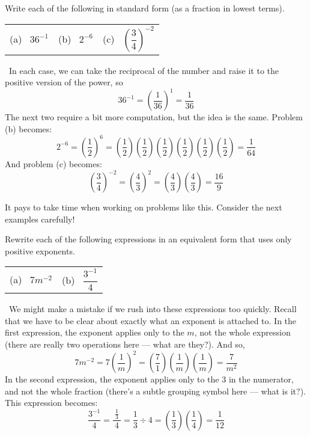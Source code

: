 \begin{boxex}
Write each of the following in standard form (as a fraction in lowest terms).

\begin{center}
\begin{tabularx}{0.6\textwidth}{XXX}
(a)~ $36^{-1}$
&
(b)~ $2^{-6}$
&
(c)~ $\left(\dfrac{3}{4}\right)^{-2}$
\end{tabularx}
\end{center}

\exsoln\ In each case, we can take the reciprocal of the number and raise it to the positive version of the power, so \[36^{-1} = \left(\frac{1}{36}\right)^1 = \frac{1}{36}\]
The next two require a bit more computation, but the idea is the same. Problem (b) becomes:
\[2^{-6} = \left(\frac{1}{2}\right)^6 = \left(\frac{1}{2}\right)\left(\frac{1}{2}\right)\left(\frac{1}{2}\right)\left(\frac{1}{2}\right)\left(\frac{1}{2}\right)\left(\frac{1}{2}\right) = \frac{1}{64}\]
And problem (c) becomes:
\[\left(\frac{3}{4}\right)^{-2} = \left(\frac{4}{3}\right)^2 = \left(\frac{4}{3}\right)\left(\frac{4}{3}\right) = \frac{16}{9}\]
\end{boxex}

It pays to take time when working on problems like this. Consider the next examples carefully!

\begin{boxex}
Rewrite each of the following expressions in an equivalent form that uses only positive exponents.
\begin{center}
\begin{tabularx}{0.4\textwidth}{XX}
(a)~ $7m^{-2}$
&
(b)~ $\dfrac{3^{-1}}{~4~}$
\end{tabularx}
\end{center}

\exsoln\ We might make a mistake if we rush into these expressions too quickly. Recall that we have to be clear about exactly what an exponent is attached to. In the first expression, the exponent applies only to the $m$, not the whole expression (there are really two operations here --- what are they?). And so,
\[7m^{-2} = 7\left(\frac{1}{m}\right)^2 = \left(\frac{7}{1}\right)\left(\frac{1}{m}\right)\left(\frac{1}{m}\right) = \frac{7}{m^2}\]
In the second expression, the exponent applies only to the 3 in the numerator, and not the whole fraction (there's a subtle grouping symbol here --- what is it?). This expression becomes:
\[\dfrac{3^{-1}}{~4~} = \dfrac{\tfrac{1}{3}}{~4~} = \frac{1}{3}\div{4} = \left(\frac{1}{3}\right)\left(\frac{1}{4}\right) = \frac{1}{12}\]
\end{boxex}

